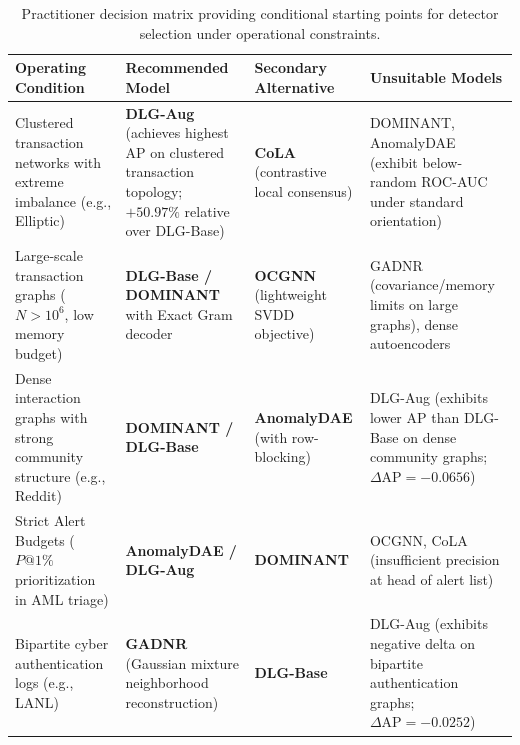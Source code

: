 \documentclass[applsci,article,submit,moreauthors,pdftex]{Definitions/mdpi}
\begin{document}
\begin{table}[htbp]
\centering\footnotesize\setlength{\tabcolsep}{4pt}
\caption{Practitioner decision matrix providing conditional starting points for detector selection under operational constraints.}
\label{tab:decision_matrix}
\begin{tabularx}{\textwidth}{>{\raggedright\arraybackslash}p{}>{\raggedright\arraybackslash}X>{\raggedright\arraybackslash}X>{\raggedright\arraybackslash}p{}}\toprule
\textbf{Operating Condition} & \textbf{Recommended Model} & \textbf{Secondary Alternative} & \textbf{Unsuitable Models} \\\midrule
Clustered transaction networks with extreme imbalance (e.g., Elliptic) & \textbf{DLG-Aug} (achieves highest AP on clustered transaction topology; $+50.97\%$ relative over DLG-Base) & \textbf{CoLA} (contrastive local consensus) & DOMINANT, AnomalyDAE (exhibit below-random ROC-AUC under standard orientation) \\
Large-scale transaction graphs ($N > 10^6$, low memory budget) & \textbf{DLG-Base / DOMINANT} with Exact Gram decoder & \textbf{OCGNN} (lightweight SVDD objective) & GADNR (covariance/memory limits on large graphs), dense autoencoders \\
Dense interaction graphs with strong community structure (e.g., Reddit) & \textbf{DOMINANT / DLG-Base} & \textbf{AnomalyDAE} (with row-blocking) & DLG-Aug (exhibits lower AP than DLG-Base on dense community graphs; $\Delta\mathrm{AP} = -0.0656$) \\
Strict Alert Budgets ($P@1\%$ prioritization in AML triage) & \textbf{AnomalyDAE / DLG-Aug} & \textbf{DOMINANT} & OCGNN, CoLA (insufficient precision at head of alert list) \\
Bipartite cyber authentication logs (e.g., LANL) & \textbf{GADNR} (Gaussian mixture neighborhood reconstruction) & \textbf{DLG-Base} & DLG-Aug (exhibits negative delta on bipartite authentication graphs; $\Delta\mathrm{AP} = -0.0252$) \\\bottomrule
\end{tabularx}
\end{table}
\end{document}
